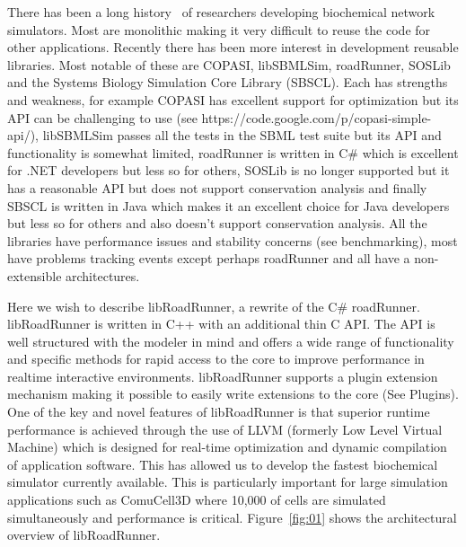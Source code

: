 \documentclass{bioinfo}
\begin{document}
There has been a long history~\citep{Bag01} of researchers developing biochemical network simulators. Most are monolithic making it very difficult to reuse the code for other applications. Recently there has been more interest in development reusable libraries. Most notable of these are COPASI, libSBMLSim, roadRunner, SOSLib and the Systems Biology Simulation Core Library (SBSCL). Each has strengths and weakness, for example COPASI has excellent support for optimization but its API can be challenging to use (see https://code.google.com/p/copasi-simple-api/), libSBMLSim passes all the tests in the SBML test suite but its API and functionality is somewhat limited, roadRunner is written in C\# which is excellent for .NET developers but less so for others, SOSLib is no longer supported but it has a reasonable API but does not support conservation analysis and finally SBSCL is written in Java which makes it an excellent choice for Java developers but less so for others and also doesn't support conservation analysis. All the libraries have performance issues and stability concerns (see benchmarking), most have problems tracking events except perhaps roadRunner and all have a non-extensible architectures.

Here we wish to describe libRoadRunner, a rewrite of the C\# roadRunner. libRoadRunner is written in C++ with an additional thin C API. The API is well structured with the modeler in mind and offers a wide range of functionality and specific methods for rapid access to the core to improve performance in realtime interactive environments. libRoadRunner supports a plugin extension mechanism making it possible to easily write extensions to the core (See Plugins). One of the key and novel features of libRoadRunner is that superior runtime performance is achieved through the use of LLVM (formerly Low Level Virtual Machine) which is designed for real-time optimization and dynamic compilation of application software. This has allowed us to develop the fastest biochemical simulator currently available. This is particularly important for large simulation applications such as ComuCell3D where 10,000 of cells are simulated simultaneously and performance is critical. Figure~\ref{fig:01} shows the architectural overview of libRoadRunner.
\end{document}
